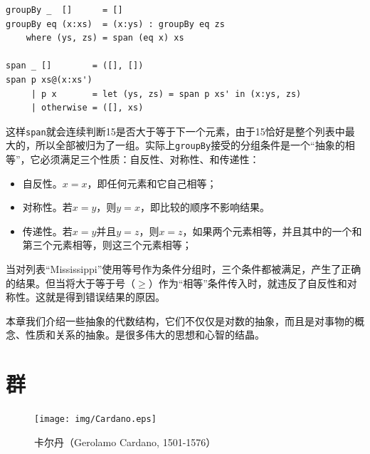 \documentclass{article}
\begin{document}
\lstset{language=Haskell, frame=single}
\begin{lstlisting}
groupBy _  []      = []
groupBy eq (x:xs)  = (x:ys) : groupBy eq zs
    where (ys, zs) = span (eq x) xs

span _ []        = ([], [])
span p xs@(x:xs')
     | p x       = let (ys, zs) = span p xs' in (x:ys, zs)
     | otherwise = ([], xs)
\end{lstlisting}

这样\texttt{span}就会连续判断15是否大于等于下一个元素，由于15恰好是整个列表中最大的，所以全部被归为了一组。实际上\texttt{groupBy}接受的分组条件是一个“抽象的相等”，它必须满足三个性质：自反性、对称性、和传递性：

\begin{itemize}
\item 自反性。$x = x$，即任何元素和它自己相等；
\item 对称性。若$x = y$，则$y = x$，即比较的顺序不影响结果。
\item 传递性。若$x = y$并且$y = z$，则$x = z$，如果两个元素相等，并且其中的一个和第三个元素相等，则这三个元素相等；
\end{itemize}

当对列表“Mississippi”使用等号作为条件分组时，三个条件都被满足，产生了正确的结果。但当将大于等于号（$\geq$）作为“相等”条件传入时，就违反了自反性和对称性。这就是得到错误结果的原因。

本章我们介绍一些抽象的代数结构，它们不仅仅是对数的抽象，而且是对事物的概念、性质和关系的抽象。是很多伟大的思想和心智的结晶。

\section{群}

\begin{figure}
 \centering
 \texttt{[image: img/Cardano.eps]}
 \captionsetup{labelformat=empty}
 \caption{卡尔丹（Gerolamo Cardano, 1501-1576）}
 \label{fig:Cardano}
\end{figure}
\end{document}
